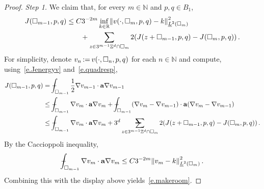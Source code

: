 \documentclass[11pt]{article} %
\makeatletter
\let\oldsquare\square %
\renewcommand{\square}{\oldsquare}
\numberwithin{equation}{section}
\theoremstyle{definition}
\let\originalleft\left
\let\originalright\right
\renewcommand{\left}{\mathopen{}\mathclose\bgroup\originalleft}
\renewcommand{\right}{\aftergroup\egroup\originalright}
\newcommand*{\N}{\ensuremath{\mathbb{N}}}
\newcommand*{\R}{\ensuremath{\mathbb{R}}}
\newcommand*{\Zd}{\ensuremath{\mathbb{Z}^d}}
\renewcommand{\a}{\mathbf{a}}
\newcommand{\cu}{\square}
\newcommand{\avsum}{\mathop{\mathpalette\avsuminner\relax}\displaylimits}
\newcommand\avsuminner[2]{%
  {\sbox0{$\m@th#1\sum$}%
   \vphantom{\usebox0}%
   \ooalign{%
     \hidewidth
     \smash{\,\rule[.23em]{8.8pt}{1.1pt} \relax}%
     \hidewidth\cr
     $\m@th#1\sum$\cr
   }%
  }%
}
\def\Xint#1{\mathchoice
{\XXint\displaystyle\textstyle{#1}}%
{\XXint\textstyle\scriptstyle{#1}}%
{\XXint\scriptstyle\scriptscriptstyle{#1}}%
{\XXint\scriptscriptstyle\scriptscriptstyle{#1}}%
\!\int}
\def\XXint#1#2#3{{\setbox0=\hbox{$#1{#2#3}{\int}$}
\vcenter{\hbox{$#2#3$}}\kern-.5\wd0}}
\def\fint{\Xint-}
\makeatother
\begin{document}
\begin{proof}
\emph{Step 1.} We claim that, for every $m\in\N$ and $p,q\in B_1$, 
\begin{align}
\label{e.makeroom}
J(\cu_{m-1},p,q) 
&
\leq 
C
3^{-2m}
\inf_{k\in\R}
\left\| v(\cdot,\cu_m,p,q) - k \right\|_{\underline{L}^2(\cu_m)}^2
\notag \\ & \qquad 
+
\sum_{z\in 3^{m-1}\Zd\cap \cu_m} 
2( J(z+\cu_{m-1},p,q) - J (\cu_m,p,q) )
\,.
\end{align}
For simplicity, denote $v_n \hspace{-1pt}  :=  \hspace{-1pt}  v(\cdot,\cu_n,p,q)$ for each $n\in\N$ and compute, using~\eqref{e.Jenergyv} and~\eqref{e.quadresp}, 
\begin{align*}
J(\cu_{m-1},p,q) 
& 
=
\fint_{\cu_{m-1}} 
\frac12
\nabla v_{m-1} 
\cdot \a\nabla v_{m-1}
\\ & 
\leq 
\fint_{\cu_{m-1}} 
\nabla v_{m} 
\cdot \a\nabla v_{m}
+
\fint_{\cu_{m-1}} 
\left( \nabla v_{m}
-
\nabla v_{m-1} \right) 
\cdot 
\a\left( \nabla v_{m}
-
\nabla v_{m-1}
\right) 
\\ & 
\leq
\fint_{\cu_{m-1}} 
\nabla v_{m} 
\cdot \a\nabla v_{m}
+
3^d 
\avsum_{z\in 3^{m-1}\Zd\cap \cu_m} 
2( J(z+\cu_{m-1},p,q) - J (\cu_m,p,q) )
\,.
\end{align*}
By the Caccioppoli inequality,
\begin{equation*}
\fint_{\cu_{m-1}}
\nabla v_m \cdot\a\nabla v_m
\leq
C
3^{-2m}
\left\| v_m -k \right\|_{\underline{L}^2(\cu_m)}^2
\,.
\end{equation*}
Combining this with the display above yields~\eqref{e.makeroom}. 

\smallskip


\end{proof}
\end{document}
